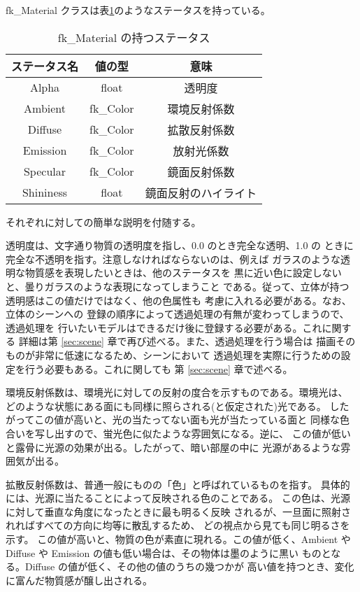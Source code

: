 fk\_Material クラスは表\ref{tbl:fkMaterial1}のようなステータスを持っている。

\begin{table}[H]
\caption{fk\_Material の持つステータス}
\label{tbl:fkMaterial1}
\begin{center}
\begin{tabular}{|c|c|c|}
\hline
ステータス名 & 値の型 & 意味 \\ \hline \hline
Alpha & float & 透明度 \\ \hline
Ambient & fk\_Color & 環境反射係数 \\ \hline
Diffuse & fk\_Color & 拡散反射係数 \\ \hline
Emission & fk\_Color & 放射光係数 \\ \hline
Specular & fk\_Color & 鏡面反射係数 \\ \hline
Shininess & float & 鏡面反射のハイライト \\ \hline
\end{tabular}
\end{center}
\end{table}
それぞれに対しての簡単な説明を付随する。

透明度は、文字通り物質の透明度を指し、0.0 のとき完全な透明、1.0 の
ときに完全な不透明を指す。注意しなければならないのは、例えば
ガラスのような透明な物質感を表現したいときは、他のステータスを
黒に近い色に設定しないと、曇りガラスのような表現になってしまうこと
である。従って、立体が持つ透明感はこの値だけではなく、他の色属性も
考慮に入れる必要がある。なお、立体のシーンへの
登録の順序によって透過処理の有無が変わってしまうので、透過処理を
行いたいモデルはできるだけ後に登録する必要がある。これに関する
詳細は第 \ref{sec:scene} 章で再び述べる。また、透過処理を行う場合は
描画そのものが非常に低速になるため、シーンにおいて
透過処理を実際に行うための設定を行う必要もある。これに関しても
第 \ref{sec:scene} 章で述べる。

環境反射係数は、環境光に対しての反射の度合を示すものである。環境光は、
どのような状態にある面にも同様に照らされる(と仮定された)光である。
したがってこの値が高いと、光の当たってない面も光が当たっている面と
同様な色合いを写し出すので、蛍光色に似たような雰囲気になる。逆に、
この値が低いと露骨に光源の効果が出る。したがって、暗い部屋の中に
光源があるような雰囲気が出る。

拡散反射係数は、普通一般にものの「色」と呼ばれているものを指す。
具体的には、光源に当たることによって反映される色のことである。
この色は、光源に対して垂直な角度になったときに最も明るく反映
されるが、一旦面に照射されればすべての方向に均等に散乱するため、
どの視点から見ても同じ明るさを示す。
この値が高いと、物質の色が素直に現れる。この値が低く、Ambient や
Diffuse や Emission の値も低い場合は、その物体は墨のように黒い
ものとなる。Diffuse の値が低く、その他の値のうちの幾つかが
高い値を持つとき、変化に富んだ物質感が醸し出される。

